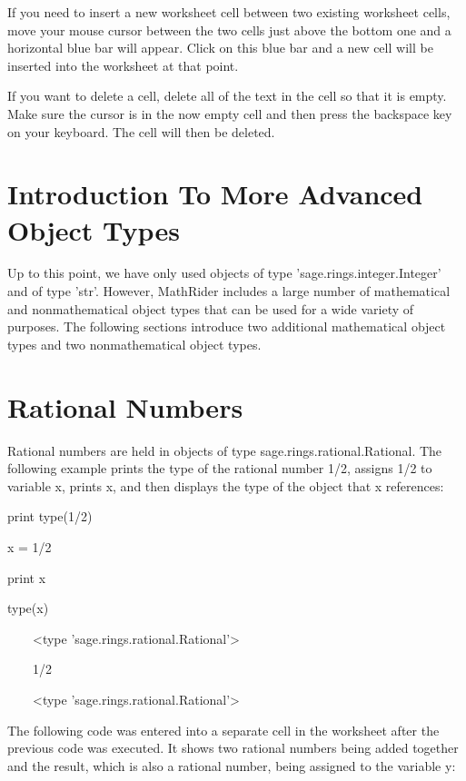 \documentclass[12pt,oneside]{book}
\begin{document}
If you need to insert a new worksheet cell between two existing worksheet cells, move your mouse cursor between the two cells just above the bottom one and a horizontal blue bar will appear. Click on this blue bar and a new cell will be inserted into the worksheet at that point. 

If you want to delete a cell, delete all of the text in the cell so that it is empty. Make sure the cursor is in the now empty cell and then press the backspace key on your keyboard. The cell will then be deleted.

\section[Introduction To More Advanced Object Types]{Introduction To More Advanced Object Types}

Up to this point, we have only used objects of type 'sage.rings.integer.Integer' and of type 'str'. However, MathRider includes a large number of mathematical and nonmathematical object types that can be used for a wide variety of purposes. The following sections introduce two additional mathematical object types and two nonmathematical object types. 

\section[Rational Numbers]{Rational Numbers}

Rational numbers are held in objects of type sage.rings.rational.Rational. The following example prints the type of the rational number 1/2, assigns 1/2 to variable x, prints x, and then displays the type of the object that x references:

print type(1/2)

x = 1/2

print x

type(x)

{\textbar}

\ \ \ \ {\textless}type 'sage.rings.rational.Rational'{\textgreater}

\ \ \ \ 1/2

\ \ \ \ {\textless}type 'sage.rings.rational.Rational'{\textgreater}


The following code was entered into a separate cell in the worksheet after the previous code was executed. It shows two rational numbers being added together and the result, which is also a rational number, being assigned to the variable y:
\end{document}
